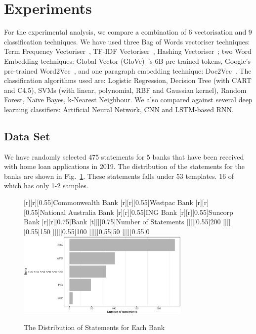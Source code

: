 \section{Experiments}\label{exp}
For the experimental analysis, we compare a combination of 6 vectorisation and 9 classification techniques. We have used three Bag of Words vectoriser techniques: Term Frequency Vectoriser~\cite{zhang2010}, TF-IDF Vectoriser~\cite{jones1972}, Hashing Vectoriser~\cite{hashing,scikit-learn}; two Word Embedding techniques: Global Vector (GloVe)~\cite{pennington2014}'s 6B pre-trained tokens, Google's pre-trained Word2Vec~\cite{mikolov2013}, and one paragraph embedding technique: Doc2Vec~\cite{le2014}. The classification algorithms used are: Logistic Regression, Decision Tree (with CART and C4.5), SVMs (with linear, polynomial, RBF and Gaussian kernel), Random Forest, Na\"ive Bayes, k-Nearest Neighbour. We also compared against several deep learning classifiers: Artificial Neural Network, CNN and LSTM-based RNN.

\subsection{Data Set}
We have randomly selected 475 statements for 5 banks that have been received with home loan applications in 2019. The distribution of the statements for the banks are shown in Fig.~\ref{banks}. These statements falls under 53 templates. 16 of which has only 1-2 samples.
\begin{figure}[H]
\centering
{}[r][r][0.55]{Commonwealth Bank}
[r][r][0.55]{Westpac Bank}
[r][r][0.55]{National Australia Bank}
[r][r][0.55]{ING Bank}
[r][r][0.55]{Suncorp Bank}
[r][r][0.75]{Bank}
[t][][0.75]{Number of Statements}
[][][0.55]{200}
[][][0.55]{150}
[][][0.55]{100}
[][][0.55]{50}
[][][0.55]{0}
\includegraphics[width=0.75\textwidth]{banks}
\caption{The Distribution of Statements for Each Bank} \label{banks}
\end{figure}

